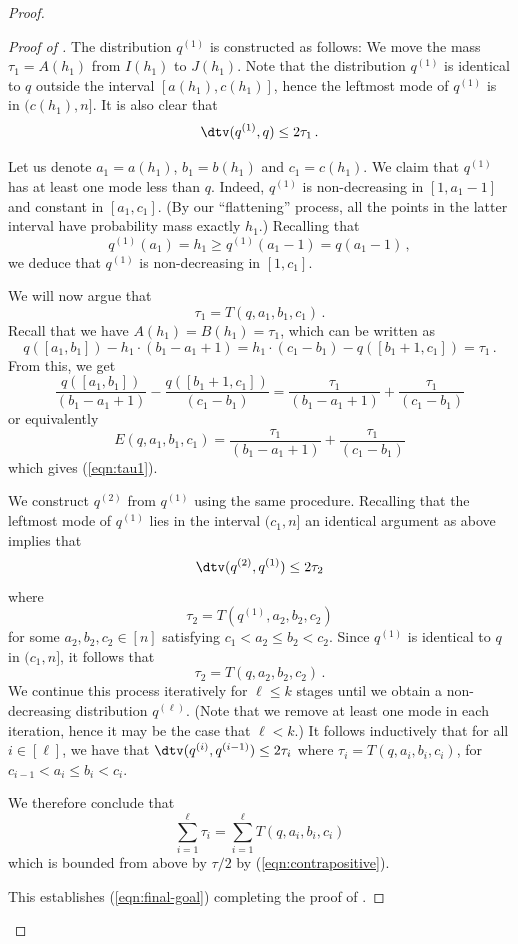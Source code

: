 \begin{proof}
\begin{proof}[Proof of ]
The distribution $q^{(1)}$ is constructed as follows: We move the
mass $\tau_1 = A(h_{{1}})$ from $I(h_{{1}})$ to $J(h_{{1}})$.
{Note that the distribution $q^{(1)}$ is identical to $q$ outside the interval $[a(h_1), c(h_1)]$, hence the leftmost
mode of $q^{(1)}$ is in $(c(h_{{1}}) , n]$. 
It is also clear that $$\dtv(q^{(1)}, q) \leq 2\tau_1\,.$$} 

{Let us denote $a_1= a(h_1)$, $b_1= b(h_1)$ and $c_1= c(h_1)$.}
We claim that $q^{(1)}$ has at least one mode less than $q$. Indeed,
$q^{(1)}$ is non-decreasing in $[1, a_1-1]$ and constant in $[a_1,c_1]$.
(By our ``flattening'' process, all the points in the latter interval have probability mass exactly $h_{{1}}$.)
Recalling that {$$q^{(1)}(a_1) = h_{{1}} \geq q^{(1)}(a_1-1) = q(a_1-1)\,,$$}
we deduce that $q^{(1)}$ is non-decreasing in $[1,{c_1}]$.

We will now argue that
\begin{equation} \label{eqn:tau1}
\tau_1 =  T(q, a_1, b_1, c_1)\,.
\end{equation}
Recall that we have $A(h_{{1}})  = B(h_{{1}}) = {\tau_1}$, which can be written as
\[
q([a_1, b_1])  - h_1 \cdot (b_1-a_1+1)  = h_1 \cdot (c_1-b_1)  - q([b_1+1,c_1]) = \tau_1\,.
\]
{}From this, we get
\[
\frac{q([a_1,b_1])}{(b_1-a_1+1)}  - \frac{q([b_1+1,c_1])}{(c_1-b_1)}
= \frac{\tau_1}{(b_1-a_1+1)} + \frac{\tau_1}{(c_1-b_1)}
\]
or equivalently
\[
E\left(q, a_1, b_1, c_1 \right) = \frac{\tau_1}{(b_1-a_1+1)} + \frac{\tau_1}{(c_1-b_1)}
\]
which gives (\ref{eqn:tau1}).

{We construct $q^{(2)}$ from $q^{(1)}$ using the same procedure. 
Recalling that the leftmost mode  of $q^{(1)}$ lies in the interval $(c_1 , n]$ 
an identical argument as above implies that
$$\dtv(q^{(2)}, q^{(1)}) \leq 2\tau_2$$
where 
$$\tau_2 =  T(q^{(1)}, a_2, b_2, c_2)$$ 
for some $a_2, b_2, c_2\in [n]$ satisfying $c_1 < a_2 \le b_2 < c_2$. Since $q^{(1)}$
is identical to $q$ in $(c_1, n]$, it follows that 
$$\tau_2 =  T(q, a_2, b_2, c_2)\,.$$ 
{We continue this process iteratively for $\ell \le k$ stages until we obtain a non-decreasing distribution $q^{(\ell)}$.
(Note that we remove at least one mode in each iteration, hence it may be the case that $\ell < k$.)}
It follows inductively that for all $i \in [\ell]$, we have that $\dtv(q^{(i)}, q^{(i-1)}) \leq 2\tau_i$
where $\tau_i =  T(q, a_i, b_i, c_i)$, for $c_{i-1} < a_{i} \le b_{i} < c_{i}$.

We therefore conclude that $$\sum_{i=1}^{\ell} \tau_i = \sum_{i=1}^{\ell} T(q, a_i, b_i, c_i)$$ which is bounded from above by 
$\tau/2$ by (\ref{eqn:contrapositive}).
}
This establishes (\ref{eqn:final-goal}) 
completing the proof of .
\end{proof}


\end{proof}
